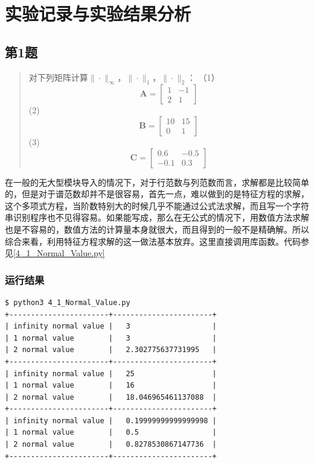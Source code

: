 \section{实验记录与实验结果分析}

\subsection{第1题}
\begin{quote}
    {\kaishu
    对下列矩阵计算$\|\cdot\|_{\infty}$，$\|\cdot\|_{1}$，$\|\cdot\|_{2}$：
    （1）\begin{equation}
            \mathbf{A}=\left[ \begin{array}{rr}{1} & {-1} \\ {2} & {1}\end{array}\right]
        \end{equation}
    (2) \begin{equation}
            \mathbf{B}=\left[ \begin{array}{rr}{10} & {15} \\ {0} & {1}\end{array}\right]
        \end{equation}
    (3) \begin{equation}
            \mathbf{C}=\left[ \begin{array}{rr}{0.6} & {-0.5} \\ {-0.1} & {0.3}\end{array}\right]
        \end{equation}
    }
\end{quote}

在一般的无大型模块导入的情况下，对于行范数与列范数而言，求解都是比较简单的，但是对于谱范数却并不是很容易，首先一点，难以做到的是特征方程的求解，这个多项式方程，当阶数特别大的时候几乎不能通过公式法求解，而且写一个字符串识别程序也不见得容易。如果能写成，那么在无公式的情况下，用数值方法求解也是不容易的，数值方法的计算量本身就很大，而且得到的一般不是精确解。所以综合来看，利用特征方程求解的这一做法基本放弃。这里直接调用库函数。代码参见\ref{4_1_Normal_Value.py}

\subsubsection{运行结果}

\begin{lstlisting}[style = bash]
$ python3 4_1_Normal_Value.py 
+-----------------------+-----------------------+
| infinity normal value |   3                   |
| 1 normal value        |   3                   |
| 2 normal value        |   2.302775637731995   |
+-----------------------+-----------------------+
| infinity normal value |   25                  |
| 1 normal value        |   16                  |
| 2 normal value        |   18.046965461137088  |
+-----------------------+-----------------------+
| infinity normal value |   0.19999999999999998 |
| 1 normal value        |   0.5                 |
| 2 normal value        |   0.8278530867147736  |
+-----------------------+-----------------------+
\end{lstlisting}

